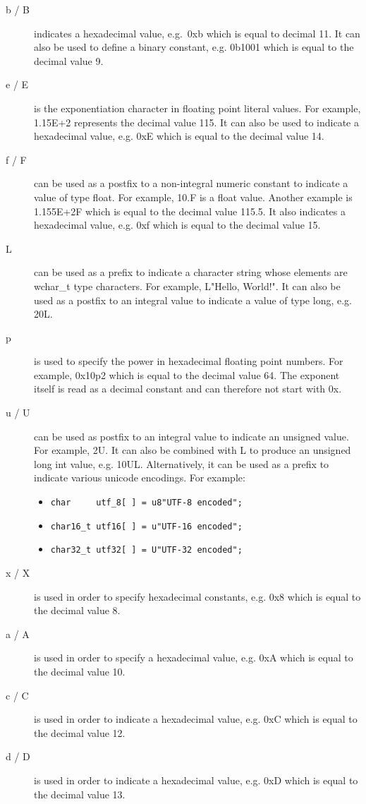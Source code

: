 \documentclass[a4paper]{article}
\newcounter{exerciseCount}
\newcommand{\exercise}[1]{\addtocounter{exerciseCount}{1} \noindent \medskip {\large \textsf{\textbf{Exercise \arabic{exerciseCount} #1}}} \par}
\begin{document}
\exercise{}
\begin{description}
	\item[b / B] indicates a hexadecimal value, e.g.\ 0xb which is equal to decimal 11. It can also be used to define a binary constant, e.g. 0b1001 which is equal to the decimal value 9.
	\item[e / E] is the exponentiation character in floating point literal values. For example, 1.15E+2 represents the decimal value 115. It can also be used to indicate a hexadecimal value, e.g. 0xE which is equal to the decimal value 14.
	\item[f / F] can be used as a postfix to a non-integral numeric constant to indicate a value of type float. For example, 10.F is a float value. Another example is 1.155E+2F which is equal to the decimal value 115.5. It also indicates a hexadecimal value, e.g. 0xf which is equal to the decimal value 15.
	\item[L] can be used as a prefix to indicate a character string whose elements are wchar\_t type characters. For example, L"Hello, World!". It can also be used as a postfix to an integral value to indicate a value of type long, e.g. 20L.
	\item[p] is used to specify the power in hexadecimal floating point numbers. For example, 0x10p2 which is equal to the decimal value 64. The exponent itself is read as a decimal constant and can therefore not start with 0x.
	\item[u / U] can be used as postfix to an integral value to indicate an unsigned value. For example, 2U. It can also be combined with L to produce an unsigned long int value, e.g. 10UL. Alternatively, it can be used as a prefix to indicate various unicode encodings. For example:
	\begin{itemize}
		\item \verb|char     utf_8[ ] = u8"UTF-8 encoded";|
		\item \verb|char16_t utf16[ ] = u"UTF-16 encoded";|
		\item \verb|char32_t utf32[ ] = U"UTF-32 encoded";|
	\end{itemize}
	\item[x / X] is used in order to specify hexadecimal constants, e.g. 0x8 which is equal to the decimal value 8.
	\item[a / A] is used in order to specify a hexadecimal value, e.g. 0xA which is equal to the decimal value 10.
	\item[c / C] is used in order to indicate a hexadecimal value, e.g. 0xC which is equal to the decimal value 12.
	\item[d / D] is used in order to indicate a hexadecimal value, e.g. 0xD which is equal to the decimal value 13.
\end{description}
\end{document}

